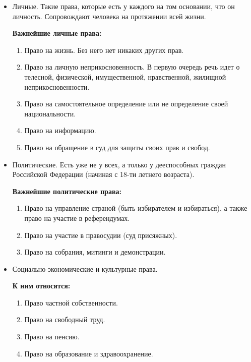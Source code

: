 \documentclass[12pt]{article}
\begin{document}
	\begin{itemize}
		\item Личные. Такие права, которые есть у каждого на том основании, что он личность. Сопровождают человека на протяжении всей жизни.
		
		\textbf{Важнейшие личные права:}
		
		\begin{enumerate}
			\item Право на жизнь. Без него нет никаких других прав.
			\item Право на личную неприкосновенность. В первую очередь речь идет о телесной, физической, имущественной, нравственной, жилищной неприкосновенности.
			\item Право на самостоятельное определение или не определение своей национальности.
			\item Право на информацию.
			\item Право на обращение в суд для защиты своих прав и свобод.
		\end{enumerate}
		
		\item Политические. Есть уже не у всех, а только у дееспособных граждан Российской Федерации (начиная с 18-ти летнего возраста).
		
		\textbf{Важнейшие политические права:}
		
		\begin{enumerate}
			\item Право на управление страной (быть избирателем и избираться), а также право на участие в референдумах.
			\item Право на участие в правосудии (суд присяжных).
			\item Право на собрания, митинги и демонстрации.
		\end{enumerate}
		
		\item Социально-экономические и культурные права.
		
		\textbf{К ним относятся:}
		
		\begin{enumerate}
			\item Право частной собственности.
			\item Право на свободный труд.
			\item Право на пенсию.
			\item Право на образование и здравоохранение.
		\end{enumerate}
	\end{itemize}
	
\end{document}
